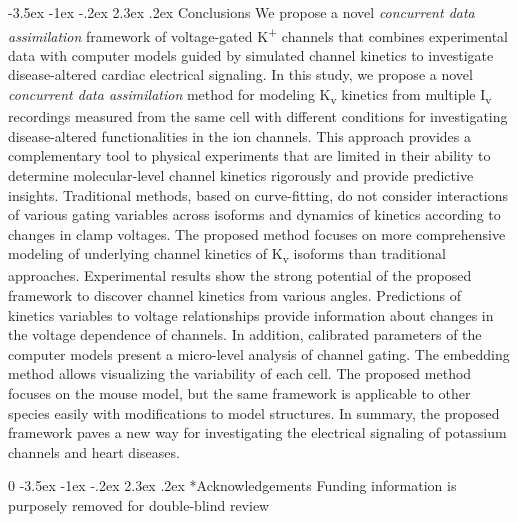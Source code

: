 \documentclass[11pt]{article}
\makeatletter
\newcommand{\blind}{0}
\renewcommand\section{\@startsection {section}{1}{\z@}%
                                   {-3.5ex \@plus -1ex \@minus -.2ex}%
                                   {2.3ex \@plus.2ex}%
                                   {\normalfont\fontfamily{phv}\fontsize{16}{19}\bfseries}}
\makeatother
\begin{document}
\section{Conclusions}
We propose a novel \textit{concurrent data assimilation} framework of voltage-gated K\textsuperscript{+} channels that combines experimental data with computer models guided by simulated channel kinetics to investigate disease-altered cardiac electrical signaling. In this study, we propose a novel \textit{concurrent data assimilation} method for modeling K\textsubscript{v} kinetics from multiple I\textsubscript{v} recordings measured from the same cell with different conditions for investigating disease-altered functionalities in the ion channels. This approach provides a complementary tool to physical experiments that are limited in their ability to determine molecular-level channel kinetics rigorously and provide predictive insights. Traditional methods, based on curve-fitting, do not consider interactions of various gating variables across isoforms and dynamics of kinetics according to changes in 
clamp voltages. The proposed method focuses on more comprehensive modeling of underlying channel kinetics of K\textsubscript{v} isoforms than traditional approaches. Experimental results show the strong potential of the proposed framework to discover channel kinetics from various angles. Predictions of kinetics variables to voltage relationships provide information about changes in the voltage dependence of channels. In addition, calibrated parameters of the computer models present a micro-level analysis of channel gating. The embedding method allows visualizing the variability of each cell. The proposed method focuses on the mouse model, but the same framework is applicable to other species easily with modifications to model structures. In summary, the proposed framework paves a new way for investigating the electrical signaling of potassium channels and heart diseases.

\blind{
\section*{Acknowledgements}
Funding information is purposely removed for double-blind review
} \fi



\end{document}
